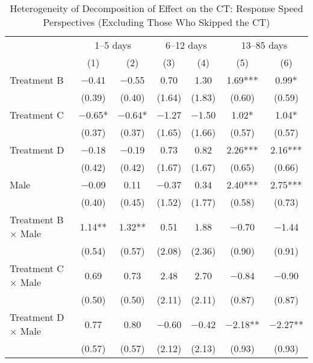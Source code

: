 \documentclass[12pt, a4paper]{article}
\begin{document}
\begin{table}[H]
\caption{\label{tab:lm-interaction-gender-test-time-decompose-noskip}Heterogeneity of Decomposition of Effect on the CT: Response Speed Perspectives (Excluding Those Who Skipped the CT)}
\centering
\fontsize{8}{10}\selectfont
\begin{threeparttable}
\begin{tabular}[t]{lcccccc}
\toprule
\multicolumn{1}{c}{ } & \multicolumn{2}{c}{1--5 days} & \multicolumn{2}{c}{6--12 days} & \multicolumn{2}{c}{13--85 days} \\
\cmidrule(l{3pt}r{3pt}){2-3} \cmidrule(l{3pt}r{3pt}){4-5} \cmidrule(l{3pt}r{3pt}){6-7}
  & (1) & (2) & (3) & (4) & (5) & (6)\\
\midrule
Treatment B & \num{-0.41} & \num{-0.55} & \num{0.70} & \num{1.30} & \num{1.69}*** & \num{0.99}*\\
 & (\num{0.39}) & (\num{0.40}) & (\num{1.64}) & (\num{1.83}) & (\num{0.60}) & (\num{0.59})\\
Treatment C & \num{-0.65}* & \num{-0.64}* & \num{-1.27} & \num{-1.50} & \num{1.02}* & \num{1.04}*\\
 & (\num{0.37}) & (\num{0.37}) & (\num{1.65}) & (\num{1.66}) & (\num{0.57}) & (\num{0.57})\\
Treatment D & \num{-0.18} & \num{-0.19} & \num{0.73} & \num{0.82} & \num{2.26}*** & \num{2.16}***\\
 & (\num{0.42}) & (\num{0.42}) & (\num{1.67}) & (\num{1.67}) & (\num{0.65}) & (\num{0.66})\\
Male & \num{-0.09} & \num{0.11} & \num{-0.37} & \num{0.34} & \num{2.40}*** & \num{2.75}***\\
 & (\num{0.40}) & (\num{0.45}) & (\num{1.52}) & (\num{1.77}) & (\num{0.58}) & (\num{0.73})\\
Treatment B $\times$ Male & \num{1.14}** & \num{1.32}** & \num{0.51} & \num{1.88} & \num{-0.70} & \num{-1.44}\\
 & (\num{0.54}) & (\num{0.57}) & (\num{2.08}) & (\num{2.36}) & (\num{0.90}) & (\num{0.91})\\
Treatment C $\times$ Male & \num{0.69} & \num{0.73} & \num{2.48} & \num{2.70} & \num{-0.84} & \num{-0.90}\\
 & (\num{0.50}) & (\num{0.50}) & (\num{2.11}) & (\num{2.11}) & (\num{0.87}) & (\num{0.87})\\
Treatment D $\times$ Male & \num{0.77} & \num{0.80} & \num{-0.60} & \num{-0.42} & \num{-2.18}** & \num{-2.27}**\\
 & (\num{0.57}) & (\num{0.57}) & (\num{2.12}) & (\num{2.13}) & (\num{0.93}) & (\num{0.93})\\

\end{tabular}
\end{threeparttable}
\end{table}
\end{document}
